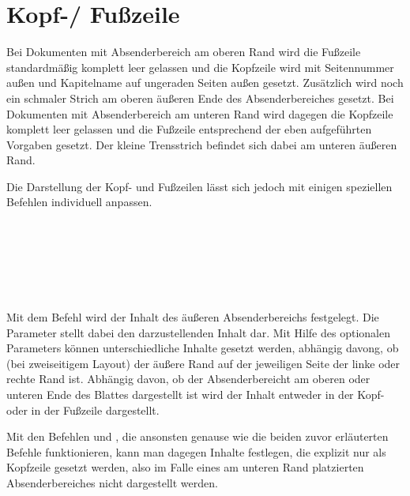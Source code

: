 \section{Kopf-/ Fußzeile}\label{sec:headline}

Bei Dokumenten mit Absenderbereich am oberen Rand wird die Fußzeile
standardmäßig komplett leer gelassen und die Kopfzeile
wird mit Seitennummer außen und Kapitelname auf ungeraden Seiten außen gesetzt.
Zusätzlich wird noch ein schmaler Strich am oberen äußeren Ende des
Absenderbereiches gesetzt.
Bei Dokumenten mit Absenderbereich am unteren Rand wird dagegen die Kopfzeile
komplett leer gelassen und die Fußzeile entsprechend der eben aufgeführten
Vorgaben gesetzt. Der kleine Trensstrich befindet sich dabei am unteren
äußeren Rand.

Die Darstellung der Kopf- und Fußzeilen lässt sich jedoch mit einigen
speziellen Befehlen individuell anpassen.

\begin{Declaration}
  \\
  \\
  \\
  \\
  \\
\end{Declaration}

Mit dem Befehl 
wird der Inhalt des äußeren Absenderbereichs festgelegt.
Die Parameter  stellt dabei den darzustellenden Inhalt dar.
Mit Hilfe des optionalen Parameters  können unterschiedliche
Inhalte gesetzt werden, abhängig davong, ob (bei zweiseitigem Layout)
der äußere Rand auf der jeweiligen Seite der linke oder rechte Rand ist.
Abhängig davon, ob der Absenderbereicht am oberen oder unteren Ende des Blattes
dargestellt ist wird der Inhalt entweder in der Kopf- oder in der Fußzeile
dargestellt.

Mit den Befehlen  und , die ansonsten genause
wie die beiden zuvor erläuterten Befehle funktionieren, kann man dagegen
Inhalte festlegen, die explizit nur als Kopfzeile gesetzt werden, also
im Falle eines am unteren Rand platzierten Absenderbereiches nicht dargestellt 
werden.

